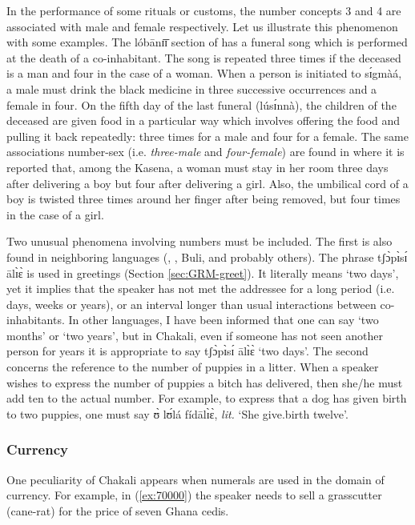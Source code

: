\begin{exe}
\begin{exe}
\begin{exe}
\begin{exe}
\begin{exe}
\begin{exe}
\begin{exe}
\begin{exe}
\begin{exe}
\begin{exe}
In the performance of some rituals or customs, the number concepts 3 and 4 are associated with male and female respectively. Let us illustrate this phenomenon with some examples. The {\sls lóbānɪ̄ɪ̄} section of  has a funeral song which is performed at the death of a co-inhabitant. The song is repeated three times if the deceased is a man and four in the case of a woman. When a person is initiated to {\sls sɪ́gmàá}, a male must drink the black medicine in three successive occurrences and a female in four.  On the fifth day of the last funeral ({\sls lúsɪ́nnà}), the children of the deceased are given food in a particular way which involves offering the food and pulling  it back repeatedly: three times for a male and four for a female. The same associations number-sex (i.e. {\it three-male} and {\it four-female}) are found in \citet[68-70]{Card27} where it is reported that, among the Kasena, a woman must stay in her room three days after delivering a boy but four after delivering a girl. Also,  the umbilical cord of a boy is twisted three times around her finger after being removed, but four times in the case of a girl.


Two unusual phenomena involving numbers must be included. The first is also found in neighboring languages (, , Buli, and probably others). The phrase {\sls tʃɔ̀pɪ̀sɪ́ ālɪ̀ɛ̀} is used in greetings (Section \ref{sec:GRM-greet}).   It literally means `two days', yet it implies that the speaker has not met the addressee for a long period  (i.e. days, weeks or years), or an interval longer than usual interactions between co-inhabitants. In other languages, I have been informed that one can say `two months' or `two years', but in Chakali, even if someone has not seen another person for years it is appropriate to say  {\sls tʃɔ̀pɪ̀sɪ́ ālɪ̀ɛ̀}  `two days'. The second concerns the reference to the number of puppies in a litter. When a speaker wishes to express the number of puppies a bitch has delivered, then she/he must add ten to the actual number. For example,  to express that a dog has given birth to two puppies, one must say {\sls ʊ̀ lʊ́lá fídālɪ̀ɛ̀},  {\it lit.}  `She give.birth twelve'. 


\subsubsection{Currency}
\label{sec:NUM-currency}

One peculiarity of Chakali appears when numerals are used in the domain of currency. For example,  in (\ref{ex:70000}) the speaker needs to sell a grasscutter (cane-rat) for the price of seven Ghana cedis.



\end{exe}
\end{exe}
\end{exe}
\end{exe}
\end{exe}
\end{exe}
\end{exe}
\end{exe}
\end{exe}
\end{exe}
